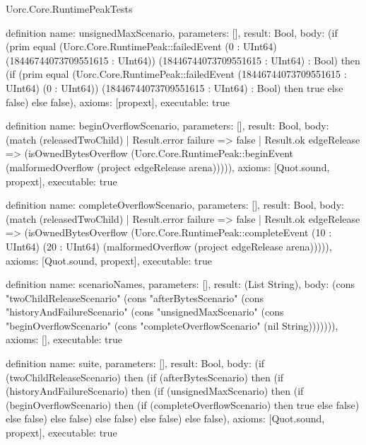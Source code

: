 \begin{lexlean}{Uorc.Core.RuntimePeakTests}
\begin{semanticmodule}
definition{
  name: unsignedMaxScenario,
  parameters: [],
  result: Bool,
  body: (if (prim equal (Uorc.Core.RuntimePeak::failedEvent (0 : UInt64) (18446744073709551615 : UInt64)) (18446744073709551615 : UInt64) : Bool) then (if (prim equal (Uorc.Core.RuntimePeak::failedEvent (18446744073709551615 : UInt64) (0 : UInt64)) (18446744073709551615 : UInt64) : Bool) then true else false) else false),
  axioms: [propext],
  executable: true
}

definition{
  name: beginOverflowScenario,
  parameters: [],
  result: Bool,
  body: (match (releasedTwoChild)
    | Result.error failure => false
    | Result.ok edgeRelease => (isOwnedBytesOverflow (Uorc.Core.RuntimePeak::beginEvent (malformedOverflow (project edgeRelease arena))))),
  axioms: [Quot.sound, propext],
  executable: true
}

definition{
  name: completeOverflowScenario,
  parameters: [],
  result: Bool,
  body: (match (releasedTwoChild)
    | Result.error failure => false
    | Result.ok edgeRelease => (isOwnedBytesOverflow (Uorc.Core.RuntimePeak::completeEvent (10 : UInt64) (20 : UInt64) (malformedOverflow (project edgeRelease arena))))),
  axioms: [Quot.sound, propext],
  executable: true
}

definition{
  name: scenarioNames,
  parameters: [],
  result: (List String),
  body: (cons "twoChildReleaseScenario" (cons "afterBytesScenario" (cons "historyAndFailureScenario" (cons "unsignedMaxScenario" (cons "beginOverflowScenario" (cons "completeOverflowScenario" (nil String))))))),
  axioms: [],
  executable: true
}

definition{
  name: suite,
  parameters: [],
  result: Bool,
  body: (if (twoChildReleaseScenario) then (if (afterBytesScenario) then (if (historyAndFailureScenario) then (if (unsignedMaxScenario) then (if (beginOverflowScenario) then (if (completeOverflowScenario) then true else false) else false) else false) else false) else false) else false),
  axioms: [Quot.sound, propext],
  executable: true
}
\end{semanticmodule}

\end{lexlean}

